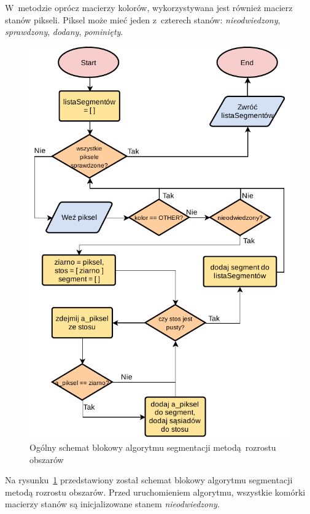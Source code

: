 W~metodzie oprócz macierzy kolorów, wykorzystywana jest również macierz stanów pikseli. Piksel może mieć jeden z~czterech stanów: \emph{nieodwiedzony}, \emph{sprawdzony}, \emph{dodany}, \emph{pominięty}.

\begin{figure}[h]
    \centering
    \includegraphics[width=\columnwidth]{figures/POBR-Segmentation.pdf}
    \caption{Ogólny schemat blokowy algorytmu segmentacji metodą rozrostu obszarów}
    \label{fig:segmentation-overview}
\end{figure}

Na rysunku~\ref{fig:segmentation-overview} przedstawiony został schemat blokowy algorytmu segmentacji metodą rozrostu obszarów. Przed uruchomieniem algorytmu, wszystkie komórki macierzy stanów są inicjalizowane stanem \emph{nieodwiedzony}.

